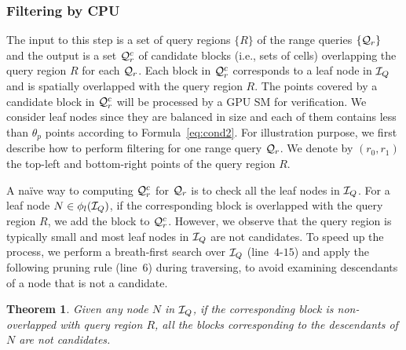 \documentclass[10pt,conference,letterpaper]{IEEEtran}
\newcommand{\rangeq}{{{\cal Q}_r}\xspace}
\newcommand{\rangecand}{{{\cal Q}_r^c}\xspace}
\newcommand{\treeindex}{{{\cal I}_Q}\xspace}
\newtheorem{theorem}{Theorem}
\begin{document}
%

\subsubsection{Filtering by CPU}

The input to this step is a set of query regions $\{R\}$ of the range queries $\{\rangeq\}$ and the output is a set $\rangecand$ of candidate blocks (i.e., sets of cells) overlapping the query region $R$ for each  $\rangeq$. Each block in $\rangecand$ corresponds to a leaf node in $\treeindex$ and is spatially overlapped with the query region $R$. The points covered by a candidate block in $\rangecand$ will be processed by a GPU SM for verification. We consider leaf nodes since they are balanced in size and each of them contains less than $\theta_p$ points according to Formula~\ref{eq:cond2}.
For illustration purpose, we first describe how to perform filtering for one range query $\rangeq$.
We denote by $(r_0, r_1)$ the top-left and bottom-right points of the query region $R$.

A na\"ive way to computing $\rangecand$ for $\rangeq$ is to check all the leaf nodes in $\treeindex$. For a leaf node $N\in\phi_l(\treeindex)$, if the corresponding block is overlapped with the query region $R$, we add the block to $\rangecand$.
However, we observe that the query region is typically small and most leaf nodes in $\treeindex$ are not candidates.
To speed up the process, we perform a breath-first search over $\treeindex$ (line~$4$-$15$) and apply the following pruning rule (line~$6$) during traversing, to avoid examining descendants of a node that is not a candidate.
%
\begin{theorem}\label{le:rangeprune}
	Given any node $N$ in $\treeindex$, if the corresponding block is non-overlapped with query region $R$, all the blocks corresponding to the descendants of $N$ are not candidates.
\end{theorem}

\end{document}
